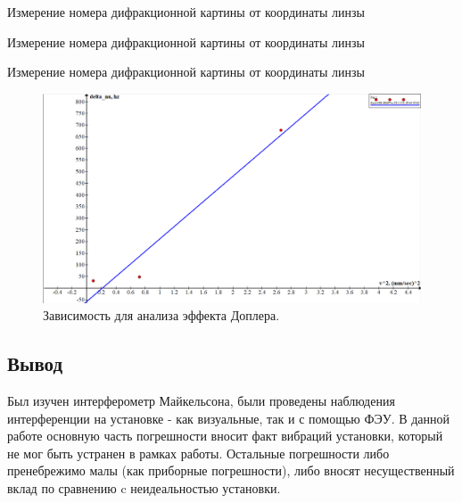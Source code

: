 \documentclass[15pt,a5paper,reqno]{article}
\begin{document}
\begin{table}[h!]
	\centering
	
	\caption{Измерение номера дифракционной картины от координаты линзы}
	\label{nu1}
\end{table}

\begin{table}[h!]
	\centering
	
	\caption{Измерение номера дифракционной картины от координаты линзы}
	\label{nu1}
\end{table}

\begin{table}[h!]
	\centering
	
	\caption{Измерение номера дифракционной картины от координаты линзы}
	\label{nu1}
\end{table}


\begin{figure}[h!]
  \centering
  \includegraphics[width=1\linewidth]{pics/lab_4_2_4_2.png}
  \caption{Зависимость для анализа эффекта Доплера.}
  \label{}
\end{figure}

\subsection{Вывод}
Был изучен интерферометр Майкельсона, были проведены наблюдения интерференции на установке - как визуальные, так и с помощью ФЭУ. В данной работе основную часть погрешности вносит факт вибраций установки, который не мог быть устранен в рамках работы. Остальные погрешности либо пренебрежимо малы (как приборные погрешности), либо вносят несущественный вклад по сравнению c неидеальностью установки.
\end{document}
